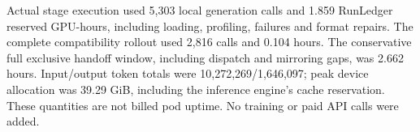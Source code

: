 Actual stage execution used 5,303 local generation calls and 1.859 RunLedger reserved GPU-hours, including loading, profiling, failures and format repairs. The complete compatibility rollout used 2,816 calls and 0.104 hours. The conservative full exclusive handoff window, including dispatch and mirroring gaps, was 2.662 hours. Input/output token totals were 10,272,269/1,646,097; peak device allocation was 39.29 GiB, including the inference engine's cache reservation. These quantities are not billed pod uptime. No training or paid API calls were added.

